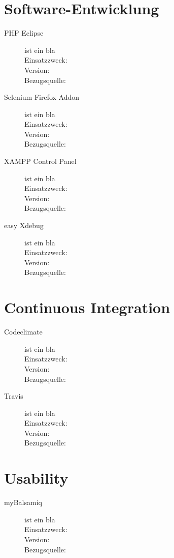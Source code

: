 \section{Software-Entwicklung}

\begin{description}
	\item [PHP Eclipse] ist ein bla \\
	Einsatzzweck: \\
	Version: \\
	Bezugsquelle: \\
	
	
	\item [Selenium Firefox Addon] ist ein bla \\
	Einsatzzweck: \\
	Version: \\
	Bezugsquelle: \\
	
	
	\item [XAMPP Control Panel] ist ein bla \\
	Einsatzzweck: \\
	Version: \\
	Bezugsquelle: \\
	
	
	\item [easy Xdebug] ist ein bla \\
	Einsatzzweck: \\
	Version: \\
	Bezugsquelle: \\
\end{description}



\section{Continuous Integration}

\begin{description}
	\item [Codeclimate] ist ein bla \\
	Einsatzzweck: \\
	Version: \\
	Bezugsquelle: \\
	
	
	\item [Travis] ist ein bla \\
	Einsatzzweck: \\
	Version: \\
	Bezugsquelle: \\
\end{description}



\section{Usability}

\begin{description}
	\item [myBalsamiq] ist ein bla \\
	Einsatzzweck: \\
	Version: \\
	Bezugsquelle: \\
\end{description}


